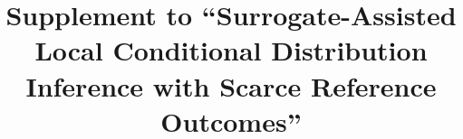 \documentclass[12pt]{article}
\title{Supplement to ``Surrogate-Assisted Local Conditional Distribution Inference with Scarce Reference Outcomes''}
\author{}
\date{}
\begin{document}
\renewcommand{\thetable}{S\arabic{table}}
\renewcommand{\thefigure}{S\arabic{figure}}
\makeatletter
\renewcommand*\l@subsection{\@dottedtocline{2}{1.5em}{3.1em}}
\makeatother
\maketitle
\begingroup
\small
\tableofcontents
\endgroup
\clearpage






















\end{document}
